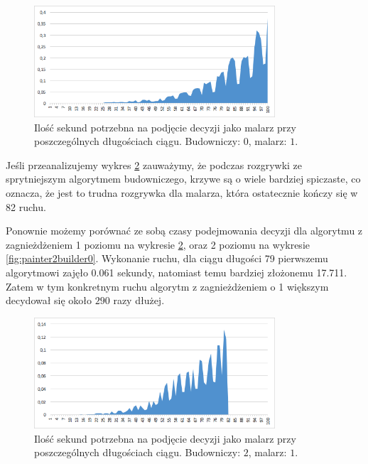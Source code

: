 \documentclass[document]{xmgr}
\begin{document}
\begin{figure}[tbh]
    \centering
    \includegraphics[width = 0.8\textwidth]{images/timePainter1Builder0}
    \caption{Ilość sekund potrzebna na podjęcie decyzji jako malarz przy poszczególnych długościach ciągu. Budowniczy: $0$, malarz: $1$.}
    \label{fig:painter1builder0}
\end{figure}

Jeśli przeanalizujemy wykres \ref{fig:painter1builder2} zauważymy, że podczas rozgrywki ze sprytniejszym algorytmem budowniczego, krzywe są o wiele bardziej spiczaste, co oznacza, że jest to trudna rozgrywka dla malarza, która ostatecznie kończy się w 82 ruchu.

Ponownie możemy porównać ze sobą czasy podejmowania decyzji dla algorytmu z zagnieżdżeniem 1 poziomu na wykresie \ref{fig:painter1builder2}, oraz 2 poziomu na wykresie \ref{fig:painter2builder0}. Wykonanie ruchu, dla ciągu długości 79 pierwszemu algorytmowi zajęło 0.061 sekundy, natomiast temu bardziej złożonemu 17.711. Zatem w tym konkretnym ruchu algorytm z zagnieżdżeniem o 1 większym decydował się około $290$ razy dłużej.

\begin{figure}[tbh]
    \centering
    \includegraphics[width = 0.8\textwidth]{images/timePainter1Builder2}
    \caption{Ilość sekund potrzebna na podjęcie decyzji jako malarz przy poszczególnych długościach ciągu. Budowniczy: $2$, malarz: $1$.}
    \label{fig:painter1builder2}
\end{figure}
\end{document}

